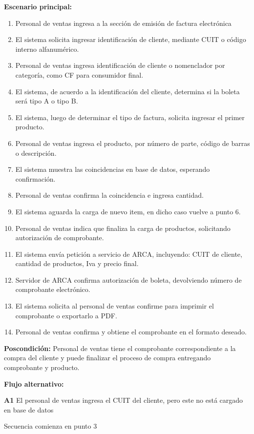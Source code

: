 \textbf{Escenario principal:}
\begin{enumerate}
	\item Personal de ventas ingresa a la sección de emisión de factura electrónica
	\item El sistema solicita ingresar identificación de cliente, mediante CUIT o código interno alfanumérico.
	\item Personal de ventas ingresa identificación de cliente o nomenclador por categoría, como CF para consumidor final.
	\item El sistema, de acuerdo a la identificación del cliente, determina si la boleta será tipo A o tipo B.
	\item El sistema, luego de determinar el tipo de factura, solicita ingresar el primer producto.
	\item Personal de ventas ingresa el producto, por número de parte, código de barras o descripción.
	\item El sistema muestra las coincidencias en base de datos, esperando confirmación.
	\item Personal de ventas confirma la coincidencia e ingresa cantidad.
	\item El sistema aguarda la carga de nuevo item, en dicho caso vuelve a punto 6.
	\item Personal de ventas indica que finaliza la carga de productos, solicitando autorización de comprobante.
	\item El sistema envía petición a servicio de ARCA, incluyendo: CUIT de cliente, cantidad de productos, Iva y precio final.
	\item Servidor de ARCA confirma autorización de boleta, devolviendo número de comprobante electrónico.
	\item El sistema solicita al personal de ventas confirme para imprimir el comprobante o exportarlo a PDF.
	\item Personal de ventas confirma y obtiene el comprobante en el formato deseado.
\end{enumerate}

\textbf{Poscondición:}
Personal de ventas tiene el comprobante correspondiente a la compra del cliente y puede finalizar el proceso de compra entregando comprobante y producto.

\textbf{Flujo alternativo:}

\textbf{A1} El personal de ventas ingresa el CUIT del cliente, pero este no está cargado en base de datos

Secuencia comienza en punto 3

